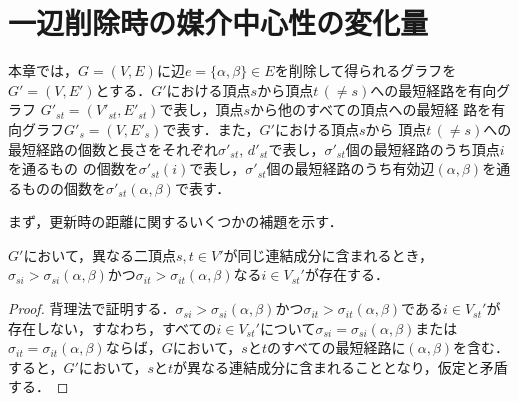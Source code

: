 \chapter{一辺削除時の媒介中心性の変化量}
\label{chap:update-bc-on-delete}
本章では，$G=(V,E)$に辺$e=\{\alpha,\beta\}\in E$を削除して得られるグラフを
$G'=(V,E')$とする．$G'$における頂点$s$から頂点$t\,(\neq s)$への最短経路を有向グラフ
$G'_{st}=(V'_{st},E'_{st})$で表し，頂点$s$から他のすべての頂点への最短経
路を有向グラフ$G'_s=(V,E'_s)$で表す．また，$G'$における頂点$s$から
頂点$t\,(\neq s)$への最短経路の個数と長さをそれぞれ$\sigma'_{st}$, 
$d'_{st}$で表し，$\sigma'_{st}$個の最短経路のうち頂点$i$を通るもの
の個数を$\sigma'_{st}(i)$で表し，$\sigma'_{st}$個の最短経路のうち有効辺$(\alpha,\beta)$を通るものの個数を$\sigma'_{st}(\alpha,\beta)$で表す．

まず，更新時の距離に関するいくつかの補題を示す．
\begin{lemma}
  \label{lemma:existence-of-vertex}
  $G'$において，異なる二頂点$s,t\in V'$が同じ連結成分に含まれるとき，$\sigma_{si}>\sigma_{si}(\alpha,\beta)$かつ$\sigma_{it}>\sigma_{it}(\alpha,\beta)$なる$i\in V_{st}'$が存在する．
\end{lemma}
\begin{proof}
  背理法で証明する．$\sigma_{si}>\sigma_{si}(\alpha,\beta)$かつ$\sigma_{it}>\sigma_{it}(\alpha,\beta)$である$i\in V_{st}'$が存在しない，すなわち，すべての$i\in V_{st}'$について$\sigma_{si}=\sigma_{si}(\alpha,\beta)$または$\sigma_{it}=\sigma_{it}(\alpha,\beta)$ならば，$G$において，$s$と$t$のすべての最短経路に$(\alpha,\beta)$を含む．すると，$G'$において，$s$と$t$が異なる連結成分に含まれることとなり，仮定と矛盾する．
\end{proof}

